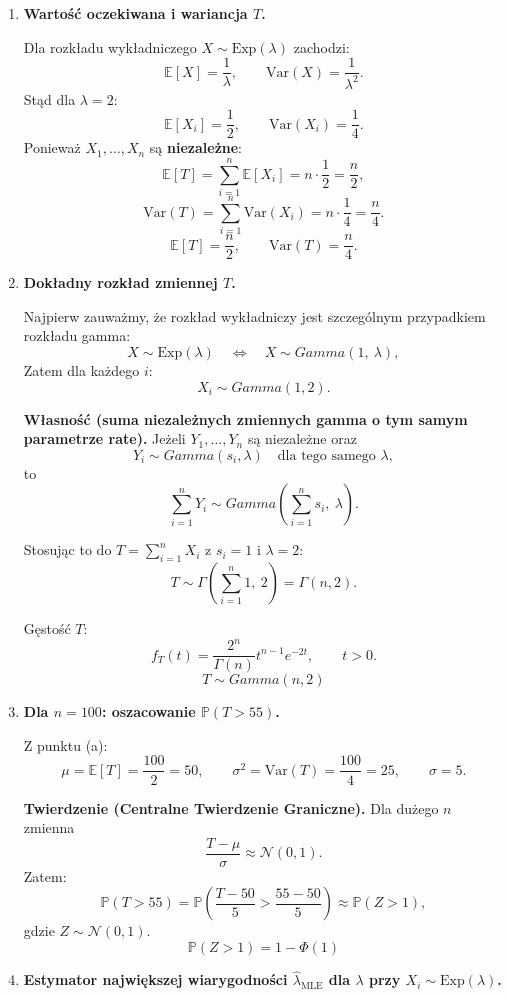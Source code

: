 \documentclass[polish, 10pt]{extarticle}
\begin{document}
\begin{enumerate}
\item[a)] \textbf{Wartość oczekiwana i wariancja $T$.}

Dla rozkładu wykładniczego $X\sim \mathrm{Exp}(\lambda)$ zachodzi:
\[
\mathbb{E}[X]=\frac{1}{\lambda},\qquad \mathrm{Var}(X)=\frac{1}{\lambda^2}.
\]
Stąd dla $\lambda=2$:
\[
\mathbb{E}[X_i]=\frac{1}{2},\qquad \mathrm{Var}(X_i)=\frac{1}{4}.
\]
Ponieważ $X_1,\dots,X_n$ są \textbf{niezależne}:
\[
\mathbb{E}[T]=\sum_{i=1}^n \mathbb{E}[X_i]=n\cdot \frac{1}{2}=\frac{n}{2},
\]
\[
\mathrm{Var}(T)=\sum_{i=1}^n \mathrm{Var}(X_i)=n\cdot \frac{1}{4}=\frac{n}{4}.
\]
\[
\boxed{\mathbb{E}[T]=\frac{n}{2},\qquad \mathrm{Var}(T)=\frac{n}{4}.}
\]

\item[b)] \textbf{Dokładny rozkład zmiennej $T$.}

Najpierw zauważmy, że rozkład wykładniczy jest szczególnym przypadkiem rozkładu gamma:
\[
X\sim \mathrm{Exp}(\lambda)\quad \Longleftrightarrow \quad X\sim Gamma(1,\ \lambda),
\]
Zatem dla każdego $i$:
\[
X_i\sim Gamma(1,2).
\]

\textbf{Własność (suma niezależnych zmiennych gamma o tym samym parametrze rate).}
Jeżeli $Y_1,\dots,Y_n$ są niezależne oraz
\[
Y_i\sim Gamma(s_i,\lambda)\quad \text{dla tego samego }\lambda,
\]
to
\[
\sum_{i=1}^n Y_i \sim Gamma\!\left(\sum_{i=1}^n s_i,\ \lambda\right).
\]

Stosując to do $T=\sum_{i=1}^n X_i$ z $s_i=1$ i $\lambda=2$:
\[
T\sim \Gamma\!\left(\sum_{i=1}^n 1,\ 2\right)=\Gamma(n,2).
\]

Gęstość $T$:
\[
f_T(t)=\frac{2^n}{\Gamma(n)}t^{n-1}e^{-2t},\qquad t> 0.
\]
\[
\boxed{T\sim Gamma(n,2)}
\]

\item[c)] \textbf{Dla $n=100$: oszacowanie $\mathbb{P}(T>55)$.}

Z punktu (a):
\[
\mu=\mathbb{E}[T]=\frac{100}{2}=50,\qquad \sigma^2=\mathrm{Var}(T)=\frac{100}{4}=25,\qquad \sigma=5.
\]

\textbf{Twierdzenie (Centralne Twierdzenie Graniczne).}
Dla dużego $n$ zmienna
\[
\frac{T-\mu}{\sigma}\approx \mathcal{N}(0,1).
\]
Zatem:
\[
\mathbb{P}(T>55)=\mathbb{P}\!\left(\frac{T-50}{5}>\frac{55-50}{5}\right)
\approx \mathbb{P}(Z>1),
\]
gdzie $Z\sim \mathcal{N}(0,1)$.
\[
\boxed{\mathbb{P}(Z>1)=1-\Phi(1)}
\]

\item[d)] \textbf{Estymator największej wiarygodności $\hat\lambda_{\mathrm{MLE}}$ dla $\lambda$ przy $X_i\sim \mathrm{Exp}(\lambda)$.}


\end{enumerate}
\end{document}
